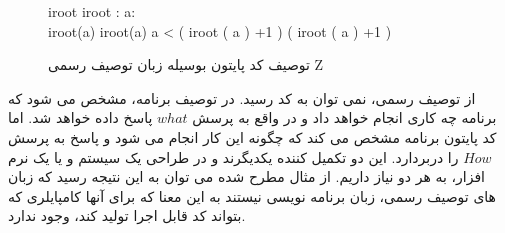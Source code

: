 \begin{figure}
\centering
\begin{schema}{iroot}
iroot :    \longrightarrow {}
\where
\forall a: \\
iroot(a) \ast iroot(a) \leq a < ( iroot ( a ) +1 ) \ast ( iroot ( a ) +1 )\\
\end{schema}
\caption{توصیف کد پایتون بوسیله زبان توصیف رسمی Z}
\label{iroot}
\end{figure} 
از توصیف رسمی، نمی توان به کد رسید. در توصیف برنامه، مشخص می شود که برنامه چه کاری انجام خواهد داد و در واقع به پرسش 
$ what $
پاسخ داده خواهد شد. اما کد پایتون برنامه مشخص می کند که چگونه این کار انجام می شود و پاسخ به پرسش
$ How $
را دربردارد. این دو تکمیل کننده یکدیگرند و در طراحی یک سیستم و یا یک نرم افزار، به هر دو نیاز داریم.
از مثال مطرح شده می توان به این نتیجه رسید که زبان های توصیف رسمی، زبان برنامه نویسی نیستند به این معنا که برای آنها کامپایلری که بتواند کد قابل اجرا تولید کند، وجود ندارد.
